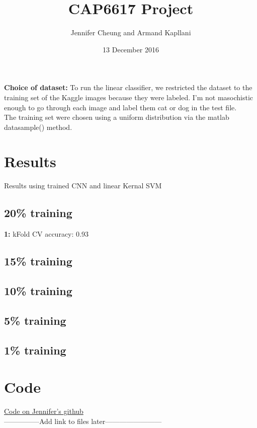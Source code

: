 \documentclass{article}
\title{CAP6617 Project}
\date{13 December 2016}
\author{Jennifer Cheung and Armand Kapllani}
\begin{document}
	\maketitle
	\textbf{Choice of dataset:}  To run the linear classifier, we restricted the dataset to the training set of the Kaggle images because they were labeled. I'm not masochistic enough to go through each image and label them cat or dog in the test file. \\
	The training set were chosen using a uniform distribution via the matlab datasample() method. \\

	\section{Results}
	Results using trained CNN and linear Kernal SVM
	\subsection{20\% training}
	\textbf{1:} kFold CV accuracy: 0.93  
	\subsection{15\% training}
	\subsection{10\% training}
	\subsection{5\% training}
	\subsection{1\% training}

	\section{Code}
	\setlength\parindent{34pt} \href{https://github.com/jenncheung/Advance-Machine-Learning-Project}{Code on Jennifer's github} \\
	 ---------------Add link to files later------------------------
\end{document}
